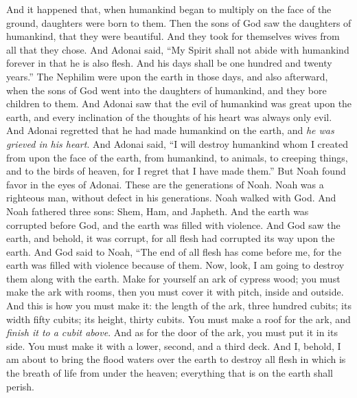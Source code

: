 \begin{biblechapter} %
 And it happened that, when humankind began to multiply on the face of the ground, daughters were born to them.
\verse Then the sons of God saw the daughters of humankind, that they were beautiful. And they took for themselves wives from all that they chose.
\verse And Adonai said, “My Spirit shall not abide with humankind forever in that he is also flesh. And his days shall be one hundred and twenty years.”
\verse The Nephilim were upon the earth in those days, and also afterward, when the sons of God went into the daughters of humankind, and they bore children to them.
\verse And Adonai saw that the evil of humankind was great upon the earth, and every inclination of the thoughts of his heart was always only evil.
\verse And Adonai regretted that he had made humankind on the earth, and \textit{he was grieved in his heart}.
\verse And Adonai said, “I will destroy humankind whom I created from upon the face of the earth, from humankind, to animals, to creeping things, and to the birds of heaven, for I regret that I have made them.”
\verse But Noah found favor in the eyes of Adonai.
\verse These are the generations of Noah. Noah was a righteous man, without defect in his generations. Noah walked with God.
\verse And Noah fathered three sons: Shem, Ham, and Japheth.
\verse And the earth was corrupted before God, and the earth was filled with violence.
\verse And God saw the earth, and behold, it was corrupt, for all flesh had corrupted its way upon the earth.
\verse And God said to Noah, “The end of all flesh has come before me, for the earth was filled with violence because of them. Now, look, I am going to destroy them along with the earth.
\verse Make for yourself an ark of cypress wood; you must make the ark with rooms, then you must cover it with pitch, inside and outside.
\verse And this is how you must make it: the length of the ark, three hundred cubits; its width fifty cubits; its height, thirty cubits.
\verse You must make a roof for the ark, and \textit{finish it to a cubit above}. And as for the door of the ark, you must put it in its side. You must make it with a lower, second, and a third deck.
\verse And I, behold, I am about to bring the flood waters over the earth to destroy all flesh in which is the breath of life from under the heaven; everything that is on the earth shall perish.

\end{biblechapter}
